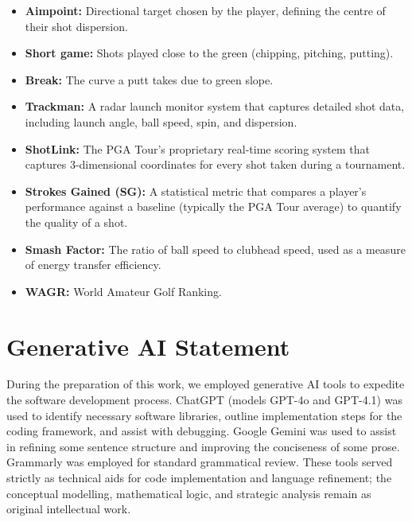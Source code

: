 \documentclass[11pt, letterpaper]{article}
\begin{document}
\begin{itemize}[noitemsep]
    \item \textbf{Aimpoint:} Directional target chosen by the player, defining the centre of their shot dispersion.
    \item \textbf{Short game:} Shots played close to the green (chipping, pitching, putting).
    \item \textbf{Break:} The curve a putt takes due to green slope.
    \item \textbf{Trackman:} A radar launch monitor system that captures detailed shot data, including launch angle, ball speed, spin, and dispersion.
    \item \textbf{ShotLink:} The PGA Tour's proprietary real-time scoring system that captures 3-dimensional coordinates for every shot taken during a tournament.
    \item \textbf{Strokes Gained (SG):} A statistical metric that compares a player's performance against a baseline (typically the PGA Tour average) to quantify the quality of a shot.
    \item \textbf{Smash Factor:} The ratio of ball speed to clubhead speed, used as a measure of energy transfer efficiency.
    \item \textbf{WAGR:} World Amateur Golf Ranking.
\end{itemize}











\newpage 



\printbibliography[title={References}]

\vspace{2cm}


\section*{Generative AI Statement}
\noindent
During the preparation of this work, we employed generative AI tools to expedite the software development process. ChatGPT (models GPT-4o and GPT-4.1) was used to identify necessary software libraries, outline implementation steps for the coding framework, and assist with debugging. Google Gemini was used to assist in refining some sentence structure and improving the conciseness of some prose. Grammarly was employed for standard grammatical review. These tools served strictly as technical aids for code implementation and language refinement; the conceptual modelling, mathematical logic, and strategic analysis remain as  original intellectual work.
\end{document}

